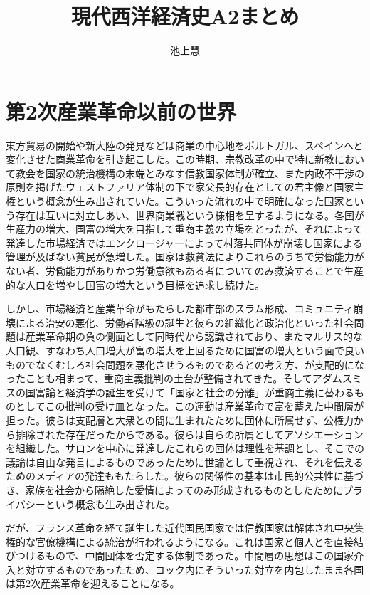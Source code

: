 \documentclass{jsarticle}
\begin{document}
\title{現代西洋経済史A2まとめ}
\author{池上慧}
\maketitle

\section{第2次産業革命以前の世界}
東方貿易の開始や新大陸の発見などは商業の中心地をポルトガル、スペインへと変化させた商業革命を引き起こした。この時期、宗教改革の中で特に新教において教会を国家の統治機構の末端とみなす信教国家体制が確立、また内政不干渉の原則を掲げたウェストファリア体制の下で家父長的存在としての君主像と国家主権という概念が生み出されていた。こういった流れの中で明確になった国家という存在は互いに対立しあい、世界商業戦という様相を呈するようになる。各国が生産力の増大、国富の増大を目指して重商主義の立場をとったが、それによって発達した市場経済ではエンクロージャーによって村落共同体が崩壊し国家による管理が及ばない貧民が急増した。国家は救貧法によりこれらのうちで労働能力がない者、労働能力がありかつ労働意欲もある者についてのみ救済することで生産的な人口を増やし国富の増大という目標を追求し続けた。

しかし、市場経済と産業革命がもたらした都市部のスラム形成、コミュニティ崩壊による治安の悪化、労働者階級の誕生と彼らの組織化と政治化といった社会問題は産業革命期の負の側面として同時代から認識されており、またマルサス的な人口観、すなわち人口増大が富の増大を上回るために国富の増大という面で良いものでなくむしろ社会問題を悪化させうるものであるとの考え方、が支配的になったことも相まって、重商主義批判の土台が整備されてきた。そしてアダムスミスの国富論と経済学の誕生を受けて「国家と社会の分離」が重商主義に替わるものとしてこの批判の受け皿となった。この運動は産業革命で富を蓄えた中間層が担った。彼らは支配層と大衆との間に生まれたために団体に所属せず、公権力から排除された存在だったからである。彼らは自らの所属としてアソシエーションを組織した。サロンを中心に発達したこれらの団体は理性を基調とし、そこでの議論は自由な発言によるものであったために世論として重視され、それを伝えるためのメディアの発達ももたらした。彼らの関係性の基本は市民的公共性に基づき、家族を社会から隔絶した愛情によってのみ形成されるものとしたためにプライバシーという概念も生み出された。

だが、フランス革命を経て誕生した近代国民国家では信教国家は解体され中央集権的な官僚機構による統治が行われるようになる。これは国家と個人とを直接結びつけるもので、中間団体を否定する体制であった。中間層の思想はこの国家介入と対立するものであったため、コック内にそういった対立を内包したまま各国は第2次産業革命を迎えることになる。
\end{document}
